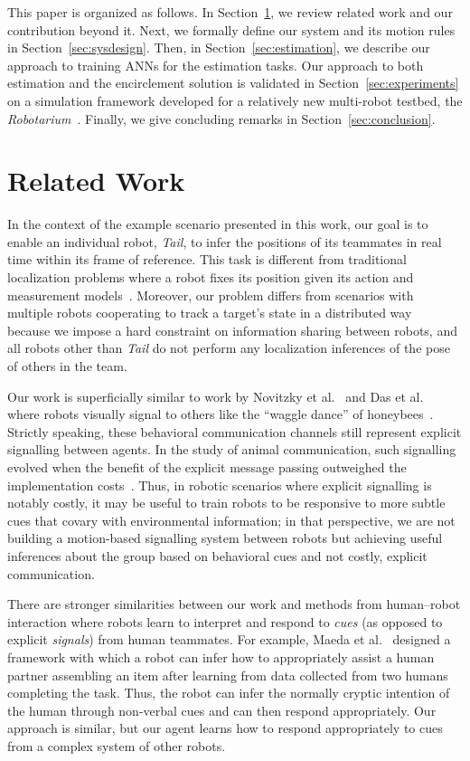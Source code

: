 \documentclass[letterpaper, 10 pt, conference]{ieeeconf}  %
\begin{document}
	This paper is organized as follows. In Section~\ref{sec:related_work},
	we review related work and our contribution beyond it. Next, we formally
	define our system and its motion rules in Section~\ref{sec:sysdesign}.
	Then, in Section~\ref{sec:estimation}, we describe our approach to
	training ANNs for the estimation tasks. Our approach to both estimation
	and the encirclement solution is validated in
	Section~\ref{sec:experiments} on a simulation framework developed for a
	relatively new multi-robot testbed, the
	\emph{Robotarium}~\cite{PWGDMAFE16}. Finally, we give concluding remarks
	in Section~\ref{sec:conclusion}.
	
	\section{Related Work}
	\label{sec:related_work}
	
	In the context of the example scenario presented in this work, our goal
	is to enable an individual robot, \emph{Tail}, to infer the positions of
	its teammates in real time within its frame of reference. This task is
	different from traditional localization problems where a robot fixes its
	position given its action and measurement models~\cite{Thrun05}.
	Moreover, our problem differs from scenarios with multiple robots
	cooperating to track a target's state in a distributed way~\cite{FSDO10,
		CX14, DMG15} because we impose a hard constraint on information sharing
	between robots, and all robots other than \emph{Tail} do not perform any
	localization inferences of the pose of others in the team.
	
	Our work is superficially similar to work by Novitzky et
	al.~\cite{NPCBW12} and Das et al.~\cite{DCV16} where robots visually
	signal to others like the ``waggle dance'' of
	honeybees~\cite{VonFrisch67, DC04}. Strictly speaking, these behavioral
	communication channels still represent explicit signalling between
	agents. In the study of animal communication, such signalling evolved
	when the benefit of the explicit message passing outweighed the
	implementation costs~\cite{BV11}. Thus, in robotic scenarios where
	explicit signalling is notably costly, it may be useful to train robots
	to be responsive to more subtle cues that covary with environmental
	information; in that perspective, we are not building a motion-based
	signalling system between robots but achieving useful inferences about
	the group based on behavioral cues and not costly, explicit
	communication.
	
	There are stronger similarities between our work and methods from
	human--robot interaction where robots learn to interpret and respond to
	\emph{cues} (as opposed to explicit \emph{signals}) from human
	teammates. For example, Maeda et al.~\cite{MELAPN14} designed a
	framework with which a robot can infer how to appropriately assist a human
	partner assembling an item after learning from data collected from two
	humans completing the task. Thus, the robot can infer the normally
	cryptic intention of the human through non-verbal cues and can then
	respond appropriately. Our approach is similar, but our agent learns how
	to respond appropriately to cues from a complex system of other robots.
	
\end{document}
